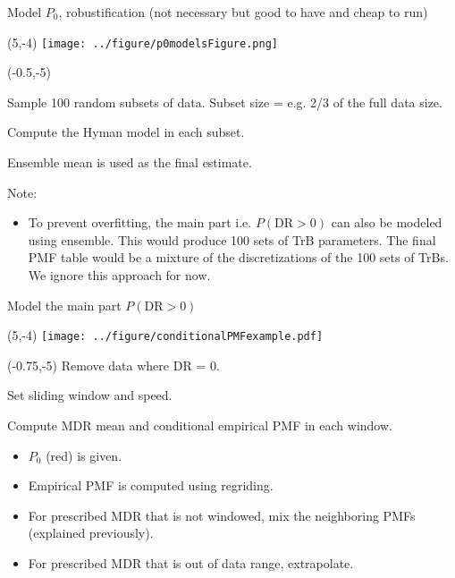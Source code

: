 \documentclass[aspectratio=169]{beamer}
\begin{document}
\begin{frame}{Model $P_0$, robustification \small(not necessary but good to have and cheap to run)}
\begin{textblock}{1}(5,-4)
\texttt{[image: ../figure/p0modelsFigure.png]}
\end{textblock}


\begin{textblock}{5}(-0.5,-5)

\small Sample 100 random subsets of data. Subset size = e.g. 2/3 of the full data size.\medskip

Compute the Hyman model in each subset.\medskip

Ensemble mean is used as the final estimate.\medskip

Note:
\begin{itemize}
\scriptsize\item To prevent overfitting, the main part i.e. $P(\text{DR} > 0)$ can also be modeled using ensemble. This would produce 100 sets of TrB parameters. The final PMF table would be a mixture of the discretizations of the 100 sets of TrBs. We ignore this approach for now.
\end{itemize}
\end{textblock}
\end{frame}


\begin{frame}{Model the main part $P(\text{DR} > 0)$ }

\begin{textblock}{1}(5,-4)
\texttt{[image: ../figure/conditionalPMFexample.pdf]}
\end{textblock}


\begin{textblock}{5.5}(-0.75,-5)
\small Remove data where DR = 0.\medskip

Set sliding window and speed.\medskip

Compute MDR mean and conditional empirical PMF in each window.\medskip

\small\begin{itemize}
\item $P_0$ (red) is given.\medskip

\item Empirical PMF is computed using regriding.\medskip\pause

\item For prescribed MDR that is not windowed, mix the neighboring PMFs (explained previously).\medskip

\item For prescribed MDR that is out of data range, extrapolate.\medskip
\end{itemize}
\end{textblock}
\end{frame}
\end{document}

